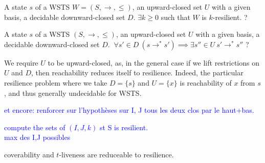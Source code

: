 


{A state $s$ of a WSTS $W=(S,\rightarrow, \leq)$, an upward-closed set $U$ with a given basis, a decidable downward-closed set $D$.}
{$\exists k \geq 0$ such that $W$ is $k$-resilient. ?\newline}

{A state $s$ of a WSTS $(S,\rightarrow, \leq)$, an upward-closed set $U$ with a given basis, a decidable downward-closed set $D$.}
{$ ~ \forall s' \in D ~ (s \rightarrow^* s') \implies \exists s'' \in U ~ s' \rightarrow^{*} s''$ ?\newline}


\begin{remark} 
We require $U$ to be upward-closed, as, in the general case if we lift restrictions on $U$ and $D$, then reachability reduces itself to resilience. Indeed, the particular resilience problem where we take $D = \{s\}$ and $U = \{x\}$ is reachability of $x$ from $s$, and thus generally undecidable for WSTS. 
\end{remark}

\textcolor{blue}{
et encore: renforcer sur l'hypothèses sur I, J tous les deux clos par le haut+bas.
}

\textcolor{blue}{
compute the sets of $(I,J,k)$ st S is resilient.\\
max des I,J possibles \\
}






\begin{proposition}\label{reductions}
coverability and $t$-liveness are reduceable to resilience.
\end{proposition}



